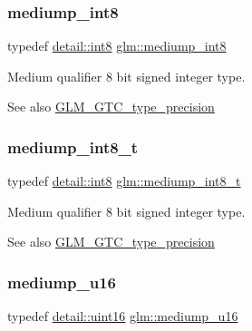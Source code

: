 \subsubsection{\texorpdfstring{mediump\+\_\+int8}{mediump\_int8}}
{\footnotesize\ttfamily typedef \hyperlink{namespaceglm_1_1detail_a04b526a8d7a9b455602a0afa78c531e0}{detail\+::int8} \hyperlink{group__gtc__type__precision_ga3ee8faab2278c44c5785af04b7b18a14}{glm\+::mediump\+\_\+int8}}

Medium qualifier 8 bit signed integer type. \begin{DoxySeeAlso}{See also}
\hyperlink{group__gtc__type__precision}{G\+L\+M\+\_\+\+G\+T\+C\+\_\+type\+\_\+precision} 
\end{DoxySeeAlso}
\mbox{\label{group__gtc__type__precision_ga626ac5f73d3538e62a879d6c56abfb36}} 
\subsubsection{\texorpdfstring{mediump\+\_\+int8\+\_\+t}{mediump\_int8\_t}}
{\footnotesize\ttfamily typedef \hyperlink{namespaceglm_1_1detail_a04b526a8d7a9b455602a0afa78c531e0}{detail\+::int8} \hyperlink{group__gtc__type__precision_ga626ac5f73d3538e62a879d6c56abfb36}{glm\+::mediump\+\_\+int8\+\_\+t}}

Medium qualifier 8 bit signed integer type. \begin{DoxySeeAlso}{See also}
\hyperlink{group__gtc__type__precision}{G\+L\+M\+\_\+\+G\+T\+C\+\_\+type\+\_\+precision} 
\end{DoxySeeAlso}
\mbox{\label{group__gtc__type__precision_ga6745262ef6a6fdb8637b2387ef924828}} 
\subsubsection{\texorpdfstring{mediump\+\_\+u16}{mediump\_u16}}
{\footnotesize\ttfamily typedef \hyperlink{namespaceglm_1_1detail_a47b2a7d006d187338e8031a352d1ce56}{detail\+::uint16} \hyperlink{group__gtc__type__precision_ga6745262ef6a6fdb8637b2387ef924828}{glm\+::mediump\+\_\+u16}}

